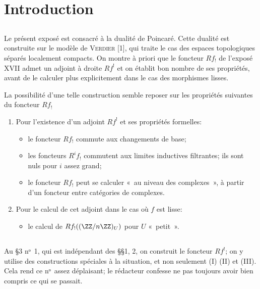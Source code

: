 \section{Introduction}\pageoriginale

\subsection{}
Le présent exposé est consacré à la dualité de Poincaré. Cette dualité est
construite sur le modèle de \textsc{Verdier} [1], qui traite le cas des espaces
topologiques séparés localement compacts. On montre à priori que le
foncteur $Rf_{!}$ de l'exposé XVII admet un adjoint à droite $Rf^{!}$
et on établit bon nombre de ses propriétés, avant de le calculer plus
explicitement dans le cas des morphismes lisses.

La possibilité d'une telle construction semble reposer sur les
propriétés suivantes du foncteur $Rf_{!}$
\begin{enumerate}
\renewcommand{\theenumi}{\alph{enumi}}
\renewcommand{\labelenumi}{\theenumi)}
\item Pour l'existence d'un adjoint $Rf^{!}$ et ses propriétés
  formelles:
\begin{itemize}
\item[(I)] le foncteur $Rf_{!}$ commute aux changements de base;

\item[(II)] les foncteurs $R^{i}f_{!}$ commutent aux limites
  inductives filtrantes; ils sont nuls pour $i$ assez grand;

\item[(III)] le foncteur $Rf_{!}$ peut se calculer « au niveau des
  complexes », \ie à partir d'un foncteur entre catégories de
  complexes.
\end{itemize}

\item Pour le calcul de cet adjoint dans le cas où $f$ est lisse:
\begin{itemize}
\item[(IV)] le calcul de $Rf_{!}((\ZZ/n\ZZ)_{U})$ pour
  $U$ « petit ».
\end{itemize}
\end{enumerate}

\subsection{}
Au \S 3 nᵒ 1, qui est indépendant des \S \S 1, 2, on
construit le foncteur $Rf^{!}$; on y utilise des constructions
spéciales à la situation, et non seulement (I) (II) et (III). Cela
rend ce nᵒ assez déplaisant; le rédacteur confesse ne
pas toujours avoir bien compris ce qui se passait.

